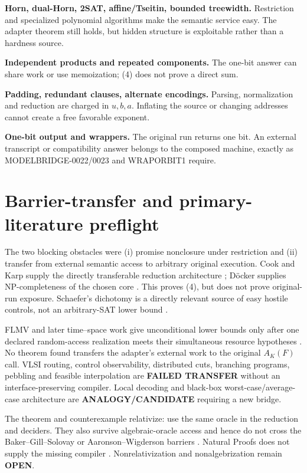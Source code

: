 \documentclass[11pt]{article}
\newcommand{\OPEN}{\textbf{OPEN}}
\begin{document}
\begin{description}[leftmargin=0cm,labelwidth=0cm]
\item[] \textbf{Horn, dual-Horn, 2SAT, affine/Tseitin, bounded treewidth.}
Restriction and specialized polynomial algorithms make the semantic service
easy.  The adapter theorem still holds, but hidden structure is exploitable
rather than a hardness source.
\item[] \textbf{Independent products and repeated components.}
The one-bit answer can share work or use memoization; (4) does not prove a
direct sum.
\item[] \textbf{Padding, redundant clauses, alternate encodings.}
Parsing, normalization and reduction are charged in \(u,b,a\).  Inflating the
source or changing addresses cannot create a free favorable exponent.
\item[] \textbf{One-bit output and wrappers.}
The original run returns one bit.  An external transcript or compatibility
answer belongs to the composed machine, exactly as MODELBRIDGE-0022/0023 and
WRAPORBIT1 require.
\end{description}

\section{Barrier-transfer and primary-literature preflight}

The two blocking obstacles were (i) promise nonclosure under restriction and
(ii) transfer from external semantic access to arbitrary original execution.
Cook and Karp supply the directly transferable reduction architecture
\cite{Cook,Karp}; D\"ocker supplies NP-completeness of the chosen core
\cite{Docker}.  This proves (4), but does not prove original-run exposure.
Schaefer's dichotomy is a directly relevant source of easy hostile controls,
not an arbitrary-SAT lower bound \cite{Schaefer}.

FLMV and later time--space work give unconditional lower bounds only after
one declared random-access realization meets their simultaneous resource
hypotheses \cite{FLMV,MW}.  No theorem found transfers the adapter's external
work to the original \(A_K(F)\) call.  VLSI routing, control observability,
distributed cuts, branching programs, pebbling and feasible interpolation
are \textbf{FAILED TRANSFER} without an interface-preserving compiler.
Local decoding and black-box worst-case/average-case architecture are
\textbf{ANALOGY/CANDIDATE} requiring a new bridge.

The theorem and counterexample relativize: use the same oracle in the
reduction and deciders.  They also survive algebraic-oracle access and hence
do not cross the Baker--Gill--Solovay or Aaronson--Wigderson barriers
\cite{BGS,AW}.  Natural Proofs does not supply the missing compiler
\cite{RR}.  Nonrelativization and nonalgebrization remain \OPEN.
\end{document}
